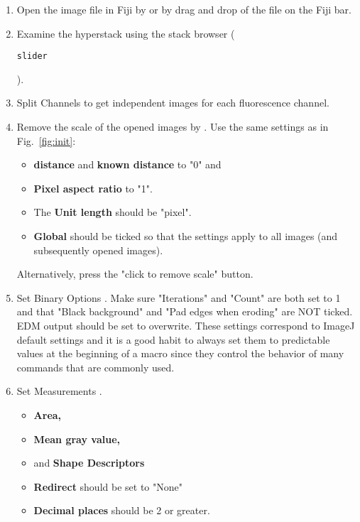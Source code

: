 \begin{enumerate}
    \item Open the image file in Fiji by
     or by drag and drop of the file on the Fiji bar.
    
    \item Examine the hyperstack using the stack browser (\begin{verbatim}
slider
\end{verbatim}).
    
    \item Split Channels to get independent images for each fluorescence channel.
    \item Remove the scale of the opened images by 
        . 
        Use the same settings as in Fig.~\ref{fig:init}:

        \begin{itemize}
            \item\textbf{distance} and \textbf{known distance} to "0" and  
            \item\textbf{Pixel aspect ratio} to "1".  
            \item The \textbf{Unit length} should be "pixel". 
            \item  \textbf{Global} should be ticked so that the settings apply to all images (and subsequently opened images).

        \end{itemize}

        Alternatively, press the "click to remove scale" button. 
    
    \item Set Binary Options 
        .
    Make sure "Iterations" and "Count" are both set to 1 and that "Black background" and "Pad edges when eroding" are NOT ticked. EDM output should be set to overwrite. These settings correspond to ImageJ default settings and it is a good habit to always set them to predictable values at the beginning of a macro since they control the behavior of many commands that are commonly used. 
    
    \item Set Measurements 
        .

    \begin{itemize}
        \item\textbf{Area,} 
        \item\textbf{Mean gray value,} 
        \item and \textbf{Shape Descriptors} 
        
        \item\textbf{Redirect} should be set to "None" 
        \item\textbf{Decimal places} should be 2 or greater.  
    
    \end{itemize}
\end{enumerate}    